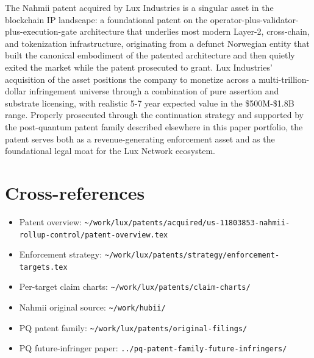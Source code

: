 \documentclass[11pt,letterpaper]{article}
\begin{document}
The Nahmii patent acquired by Lux Industries is a singular asset in the blockchain IP landscape: a foundational patent on the operator-plus-validator-plus-execution-gate architecture that underlies most modern Layer-2, cross-chain, and tokenization infrastructure, originating from a defunct Norwegian entity that built the canonical embodiment of the patented architecture and then quietly exited the market while the patent prosecuted to grant. Lux Industries' acquisition of the asset positions the company to monetize across a multi-trillion-dollar infringement universe through a combination of pure assertion and substrate licensing, with realistic 5-7 year expected value in the \$500M-\$1.8B range. Properly prosecuted through the continuation strategy and supported by the post-quantum patent family described elsewhere in this paper portfolio, the patent serves both as a revenue-generating enforcement asset and as the foundational legal moat for the Lux Network ecosystem.

\section*{Cross-references}

\begin{itemize}
\item Patent overview: \texttt{\textasciitilde/work/lux/patents/acquired/us-11803853-nahmii-rollup-control/patent-overview.tex}
\item Enforcement strategy: \texttt{\textasciitilde/work/lux/patents/strategy/enforcement-targets.tex}
\item Per-target claim charts: \texttt{\textasciitilde/work/lux/patents/claim-charts/}
\item Nahmii original source: \texttt{\textasciitilde/work/hubii/}
\item PQ patent family: \texttt{\textasciitilde/work/lux/patents/original-filings/}
\item PQ future-infringer paper: \texttt{../pq-patent-family-future-infringers/}
\end{itemize}
\end{document}
